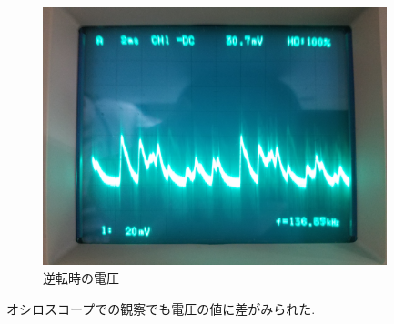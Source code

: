 \begin{figure}[htbp]
 \begin{center}
    \includegraphics[width=100mm]{img/osiro_gyakuten.jpg}
    \end{center}
  \caption{逆転時の電圧}
 \label{fig:osiro_gyakuten}
\end{figure}







オシロスコープでの観察でも電圧の値に差がみられた.
